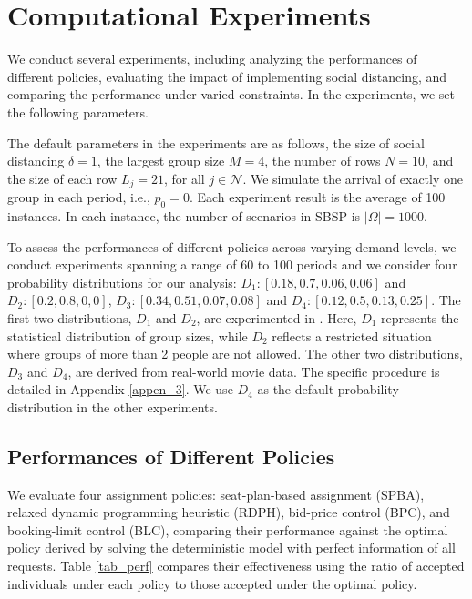 \section{Computational Experiments}\label{sec_result}
We conduct several experiments, including analyzing the performances of different policies, evaluating the impact of implementing social distancing, and comparing the performance under varied constraints.
In the experiments, we set the following parameters. 

The default parameters in the experiments are as follows, the size of social distancing $\delta =1$, the largest group size $M =4$, the number of rows $N = 10$, and the size of each row $L_j = 21$, for all $j \in \mathcal{N}$. We simulate the arrival of exactly one group in each period, i.e., $p_0 = 0$. Each experiment result is the average of 100 instances. In each instance, the number of scenarios in SBSP is $|\Omega| = 1000$.

To assess the performances of different policies across varying demand levels, we conduct experiments spanning a range of 60 to 100 periods and we consider four probability distributions for our analysis: $D_1:[0.18,0.7,0.06,0.06]$ and $D_2:[0.2,0.8,0,0]$, $D_3: [0.34, 0.51, 0.07, 0.08]$ and $D_4: [0.12, 0.5, 0.13, 0.25]$. The first two distributions, $D_1$ and $D_2$, are experimented in \cite{blom2022filling}. Here, $D_1$ represents the statistical distribution of group sizes, while $D_2$ reflects a restricted situation where groups of more than 2 people are not allowed. The other two distributions, $D_3$ and $D_4$, are derived from real-world movie data. The specific procedure is detailed in Appendix \ref{appen_3}. We use $D_4$ as the default probability distribution in the other experiments.


\subsection{Performances of Different Policies}
We evaluate four assignment policies: seat-plan-based assignment (SPBA), relaxed dynamic programming heuristic (RDPH), bid-price control (BPC), and booking-limit control (BLC), comparing their performance against the optimal policy derived by solving the deterministic model with perfect information of all requests. Table \ref{tab_perf} compares their effectiveness using the ratio of accepted individuals under each policy to those accepted under the optimal policy.


